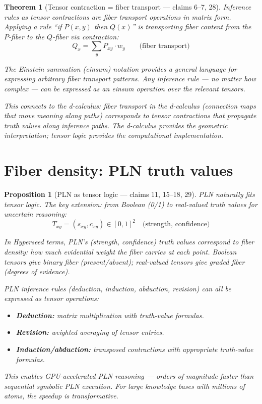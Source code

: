 \documentclass[11pt,a4paper]{article}
\newtheorem{theorem}[definition]{Theorem}
\newtheorem{proposition}[definition]{Proposition}
\begin{document}
\begin{theorem}[Tensor contraction = fiber transport --- claims 6--7, 28]
\label{thm:transport}
Inference rules as tensor contractions are fiber transport operations in
matrix form. Applying a rule ``if $P(x,y)$ then $Q(x)$'' is transporting
fiber content from the $P$-fiber to the $Q$-fiber via contraction:
\[
  Q_x = \sum_y P_{xy} \cdot w_{y} \qquad \text{(fiber transport)}
\]

The Einstein summation (einsum) notation provides a general language for
expressing arbitrary fiber transport patterns. Any inference rule ---
no matter how complex --- can be expressed as an einsum operation over
the relevant tensors.

This connects to the d-calculus: fiber transport in the d-calculus
(connection maps that move meaning along paths) corresponds to tensor
contractions that propagate truth values along inference paths. The
d-calculus provides the geometric interpretation; tensor logic provides
the computational implementation.
\end{theorem}

\section{Fiber density: PLN truth values}
\label{sec:pln}

\begin{proposition}[PLN as tensor logic --- claims 11, 15--18, 29]
\label{prop:pln}
PLN naturally fits tensor logic. The key extension: from Boolean (0/1)
to real-valued truth values for uncertain reasoning:
\[
  T_{xy} = (s_{xy}, c_{xy}) \in [0,1]^2
  \quad \text{(strength, confidence)}
\]

In Hyperseed terms, PLN's (strength, confidence) truth values correspond
to \emph{fiber density}: how much evidential weight the fiber carries at
each point. Boolean tensors give binary fiber (present/absent); real-valued
tensors give graded fiber (degrees of evidence).

PLN inference rules (deduction, induction, abduction, revision) can all
be expressed as tensor operations:
\begin{itemize}
\item \textbf{Deduction:} matrix multiplication with truth-value formulas.
\item \textbf{Revision:} weighted averaging of tensor entries.
\item \textbf{Induction/abduction:} transposed contractions with appropriate
  truth-value formulas.
\end{itemize}

This enables GPU-accelerated PLN reasoning --- orders of magnitude faster
than sequential symbolic PLN execution. For large knowledge bases with
millions of atoms, the speedup is transformative.
\end{proposition}
\end{document}
